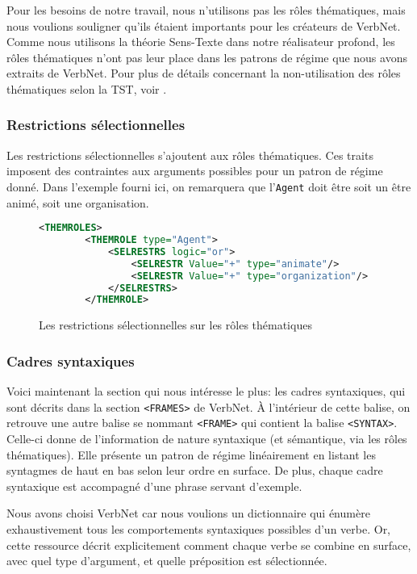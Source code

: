 Pour les besoins de notre travail, nous n'utilisons pas les rôles thématiques, mais nous voulions souligner qu'ils étaient importants pour les créateurs de VerbNet. Comme nous utilisons la théorie Sens-Texte dans notre réalisateur profond, les rôles thématiques n'ont pas leur place dans les patrons de régime que nous avons extraits de VerbNet. Pour plus de détails concernant la non-utilisation des rôles thématiques selon la TST, voir \cite[pp.~227--234]{mel2012semantics}.

\subsubsection{Restrictions sélectionnelles}
Les restrictions sélectionnelles s'ajoutent aux rôles thématiques. Ces traits imposent des contraintes aux arguments possibles pour un patron de régime donné. Dans l'exemple fourni ici, on remarquera que l'\texttt{Agent} doit être soit un être animé, soit une organisation.

\begin{figure}[htb]
 \caption{Les restrictions sélectionnelles sur les rôles thématiques}
\begin{lstlisting}[language=Xml]
    <THEMROLES>
        <THEMROLE type="Agent">
            <SELRESTRS logic="or">
                <SELRESTR Value="+" type="animate"/>
                <SELRESTR Value="+" type="organization"/>
            </SELRESTRS>
        </THEMROLE>
\end{lstlisting}
\end{figure}

\subsubsection{Cadres syntaxiques}

Voici maintenant la section qui nous intéresse le plus: les cadres syntaxiques, qui sont décrits dans la section \lstinline{<FRAMES>} de VerbNet. À l'intérieur de cette balise, on retrouve une autre balise se nommant \lstinline{<FRAME>} qui contient la balise \lstinline{<SYNTAX>}. Celle-ci donne de l'information de nature syntaxique (et sémantique, via les rôles thématiques). Elle présente un patron de régime linéairement en listant les syntagmes de haut en bas selon leur ordre en surface. De plus, chaque cadre syntaxique est accompagné d'une phrase servant d'exemple.

Nous avons choisi VerbNet car nous voulions un dictionnaire qui énumère exhaustivement tous les comportements syntaxiques possibles d'un verbe. Or, cette ressource décrit explicitement comment chaque verbe se combine en surface, avec quel type d'argument, et quelle préposition est sélectionnée.

